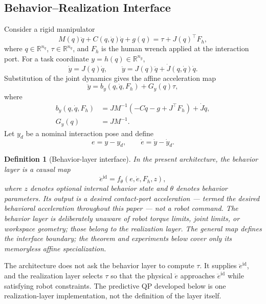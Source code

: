\documentclass[journal]{IEEEtran}
\newtheorem{definition}{Definition}
\begin{document}
\subsection{Behavior--Realization Interface}
\label{sec:interface}

Consider a rigid manipulator
\begin{equation}
M(q)\ddot q+C(q,\dot q)\dot q+g(q) =\tau+J(q)^\top F_h,
\end{equation}
where $q\in\mathbb R^{n_q}$, $\tau\in\mathbb R^{n_q}$, and $F_h$ is the
human wrench applied at the interaction port. For a task coordinate
$y=h(q)\in\mathbb R^{n_y}$,
\begin{equation}
\dot y=J(q)\dot q, \qquad \ddot y=J(q)\ddot q+\dot J(q,\dot q)\dot q.
\end{equation}
Substitution of the joint dynamics gives the affine acceleration map
\begin{equation}
\ddot y =b_y(q,\dot q,F_h)+G_y(q)\tau,
\end{equation}
where
\begin{align}
b_y(q,\dot q,F_h) &= J M^{-1}\left(-C\dot q-g+J^\top F_h\right)+\dot J\dot q,\\
G_y(q)&=JM^{-1}.
\end{align}
Let $y_d$ be a nominal interaction pose and define
\begin{equation}
e=y-y_d, \qquad \dot e=\dot y-\dot y_d.
\end{equation}

\begin{definition}[Behavior-layer interface]
\label{def:interface}
In the present architecture, the behavior layer is a causal map
\begin{equation}
\ddot e^{\mathrm{id}} =f_\theta(e,\dot e,F_h,z),
\end{equation}
where $z$ denotes optional internal behavior state and $\theta$ denotes
behavior parameters. Its output is a desired contact-port acceleration
--- termed the \emph{desired behavioral acceleration} throughout this
paper --- not a robot command. The behavior layer is deliberately
unaware of robot torque limits, joint limits, or workspace geometry;
those belong to the realization layer. The general map defines the
interface boundary; the theorem and experiments below cover only its
memoryless affine specialization.
\end{definition}

The architecture does not ask the behavior layer to compute $\tau$. It
supplies $\ddot e^{\mathrm{id}}$, and the realization layer selects
$\tau$ so that the physical $\ddot e$ approaches $\ddot e^{\mathrm{id}}$
while satisfying robot constraints. The predictive QP developed below is
one realization-layer implementation, not the definition of the layer
itself.
\end{document}
